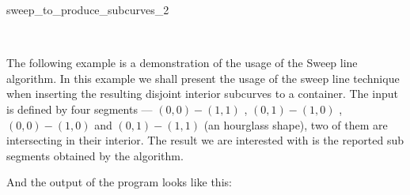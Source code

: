 \begin{ccRefFunction}{sweep_to_produce_subcurves_2}
\ccSeeAlso

 \\



\ccExample
\label{ssec:example3_sweep}
The following example is a demonstration of the usage of the \ccc
{Sweep line} algorithm. In this example we shall present the usage of
the sweep line technique when inserting the resulting disjoint
interior subcurves to a container. 
The input is defined by four segments
--- $(0,0)-(1,1)$ , $(0,1)-(1,0)$ , $(0,0)-(1,0)$ and $(0,1)-(1,1)$
(an hourglass shape), two of them are intersecting in their
interior. The result we are interested with
is the reported sub segments obtained by the 
algorithm.


And the output of the program looks like this:


\end{ccRefFunction}













